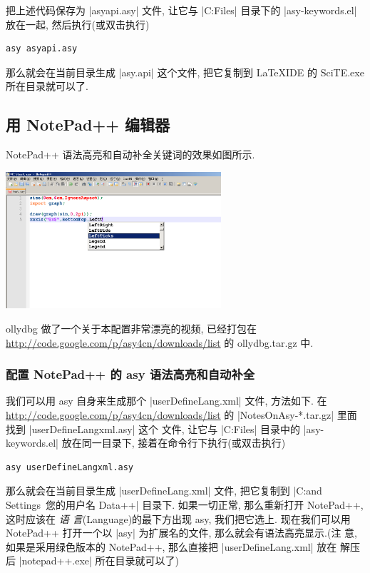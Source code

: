 \documentclass{ctexbook}
\begin{document}


把上述代码保存为 |asyapi.asy| 文件, 让它与 |C:\Program Files\Asymptote|
目录下的 |asy-keywords.el| 放在一起, 然后执行(或双击执行)
\begin{verbatim}
asy asyapi.asy
\end{verbatim}
那么就会在当前目录生成 |asy.api| 这个文件, 把它复制到 LaTeXIDE 的
SciTE.exe 所在目录就可以了.

\subsection{用 NotePad++ 编辑器}
NotePad++ 语法高亮和自动补全关键词的效果如图所示.
\begin{center}
  \includegraphics[width=0.6\textwidth]{NotePad++0.png}
\end{center}
ollydbg 做了一个关于本配置非常漂亮的视频, 已经打包在
\url{http://code.google.com/p/asy4cn/downloads/list} 的
ollydbg.tar.gz 中.

\subsubsection{配置 NotePad++ 的 asy 语法高亮和自动补全}
我们可以用 asy 自身来生成那个 |userDefineLang.xml| 文件, 方法如下.
在 \url{http://code.google.com/p/asy4cn/downloads/list} 的
|NotesOnAsy-*.tar.gz| 里面找到 |userDefineLangxml.asy| 这个
文件, 让它与 |C:\Program Files\Asymptote| 目录中的 |asy-keywords.el|
放在同一目录下, 接着在命令行下执行(或双击执行)
\begin{verbatim}
asy userDefineLangxml.asy
\end{verbatim}
那么就会在当前目录生成 |userDefineLang.xml| 文件, 把它复制到
|C:\Documents and Settings\ 您的用户名 \Application Data\Notepad++|
目录下. 如果一切正常, 那么重新打开 NotePad++, 这时应该在 \emph{语
  言}(Language)的最下方出现 asy, 我们把它选上. 现在我们可以用
NotePad++ 打开一个以 |asy| 为扩展名的文件, 那么就会有语法高亮显示.(注
意, 如果是采用绿色版本的 NotePad++, 那么直接把 |userDefineLang.xml| 放在
解压后 |notepad++.exe| 所在目录就可以了)
\end{document}
